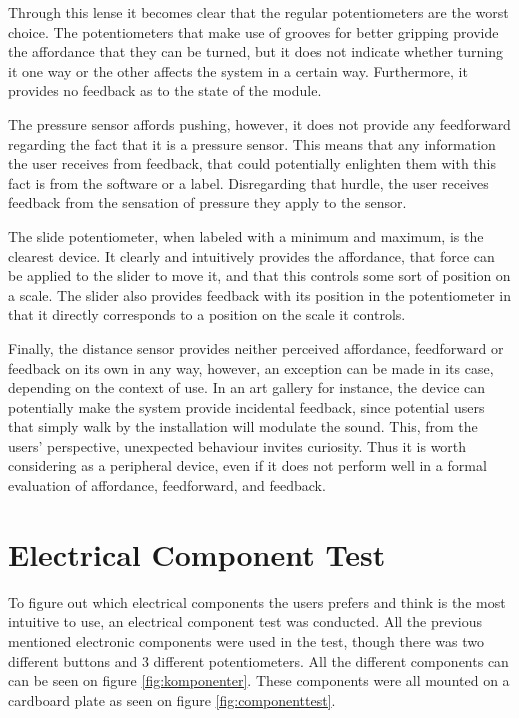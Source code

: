Through this lense it becomes clear that the regular potentiometers are the worst choice. The potentiometers that make use of grooves for better gripping provide the affordance that they can be turned, but it does not indicate whether turning it one way or the other affects the system in a certain way. Furthermore, it provides no feedback as to the state of the module. 

The pressure sensor affords pushing, however, it does not provide any feedforward regarding the fact that it is a pressure sensor. This means that any information the user receives from feedback, that could potentially enlighten them with this fact is from the software or a label. Disregarding that hurdle, the user receives feedback from the sensation of pressure they apply to the sensor. 

The slide potentiometer, when labeled with a minimum and maximum, is the clearest device. It clearly and intuitively provides the affordance, that force can be applied to the slider to move it, and that this controls some sort of position on a scale. The slider also provides feedback with its position in the potentiometer in that it directly corresponds to a position on the scale it controls. 

Finally, the distance sensor provides neither perceived affordance, feedforward or feedback on its own in any way, however, an exception can be made in its case, depending on the context of use. In an art gallery for instance, the device can potentially make the system provide incidental feedback, since potential users that simply walk by the installation will modulate the sound. This, from the users' perspective, unexpected behaviour invites curiosity. Thus it is worth considering as a peripheral device, even if it does not perform well in a formal evaluation of affordance, feedforward, and feedback.

\section{Electrical Component Test}\label{sec:comptest}
To figure out which electrical components the users prefers and think is the most intuitive to use, an electrical component test was conducted. All the previous mentioned electronic components were used in the test, though there was two different buttons and 3 different potentiometers. All the different components can can be seen on figure \ref{fig:komponenter}. These components were all mounted on a cardboard plate as seen on figure  \ref{fig:componenttest}.

